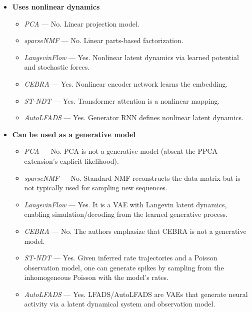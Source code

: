 \begin{itemize}
\item \textbf{Uses nonlinear dynamics}
    \begin{itemize}
    \item \textit{PCA} — No. Linear projection model.
    \item \textit{sparseNMF} — No. Linear parts-based factorization.
    \item \textit{LangevinFlow} — Yes. Nonlinear latent dynamics via learned potential and stochastic forces.
    \item \textit{CEBRA} — Yes. Nonlinear encoder network learns the embedding.
    \item \textit{ST-NDT} — Yes. Transformer attention is a nonlinear mapping.
    \item \textit{AutoLFADS} — Yes. Generator RNN defines nonlinear latent dynamics.
    \end{itemize}

\item \textbf{Can be used as a generative model}
    \begin{itemize}
    \item \textit{PCA} — No. PCA is not a generative model (absent the PPCA extension's explicit likelihood).
    \item \textit{sparseNMF} — No. Standard NMF reconstructs the data matrix but is not typically used for sampling new sequences.
    \item \textit{LangevinFlow} — Yes. It is a VAE with Langevin latent dynamics, enabling simulation/decoding from the learned generative process.
    \item \textit{CEBRA} — No. The authors emphasize that CEBRA is not a generative model.
    \item \textit{ST-NDT} — Yes. Given inferred rate trajectories and a Poisson observation model, one can generate spikes by sampling from the inhomogeneous Poisson with the model's rates.
    \item \textit{AutoLFADS} — Yes. LFADS/AutoLFADS are VAEs that generate neural activity via a latent dynamical system and observation model.
    \end{itemize}


\end{itemize}
